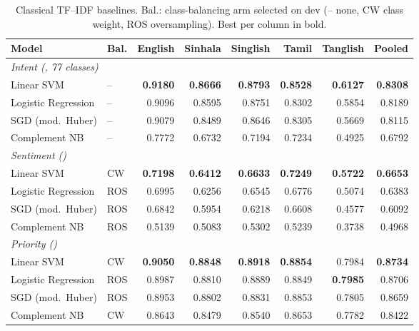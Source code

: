 \begin{table}[!htbp]
\caption{Classical TF--IDF baselines. Bal.: class-balancing arm selected on
dev (-- none, CW class weight, ROS oversampling). Best per column in bold.}
\label{tab:classical_baselines}
\centering
\scriptsize
\setlength{\tabcolsep}{2.6pt}
\begin{tabular}{@{}llrrrrrr@{}}
\toprule
Model & Bal. & English & Sinhala & Singlish & Tamil & Tanglish & Pooled \\
\midrule
\multicolumn{8}{l}{\textit{Intent (\macrof{}, 77 classes)}} \\
Linear SVM & -- & \textbf{0.9180} & \textbf{0.8666} & \textbf{0.8793} & \textbf{0.8528} & \textbf{0.6127} & \textbf{0.8308} \\
Logistic Regression & -- & 0.9096 & 0.8595 & 0.8751 & 0.8302 & 0.5854 & 0.8189 \\
SGD (mod.\ Huber) & -- & 0.9079 & 0.8489 & 0.8646 & 0.8305 & 0.5669 & 0.8115 \\
Complement NB & -- & 0.7772 & 0.6732 & 0.7194 & 0.7234 & 0.4925 & 0.6792 \\
\midrule
\multicolumn{8}{l}{\textit{Sentiment (\negf{})}} \\
Linear SVM & CW & \textbf{0.7198} & \textbf{0.6412} & \textbf{0.6633} & \textbf{0.7249} & \textbf{0.5722} & \textbf{0.6653} \\
Logistic Regression & ROS & 0.6995 & 0.6256 & 0.6545 & 0.6776 & 0.5074 & 0.6383 \\
SGD (mod.\ Huber) & ROS & 0.6842 & 0.5954 & 0.6218 & 0.6608 & 0.4577 & 0.6092 \\
Complement NB & ROS & 0.5139 & 0.5083 & 0.5302 & 0.5239 & 0.3738 & 0.4968 \\
\midrule
\multicolumn{8}{l}{\textit{Priority (\macrof{})}} \\
Linear SVM & CW & \textbf{0.9050} & \textbf{0.8848} & \textbf{0.8918} & \textbf{0.8854} & 0.7984 & \textbf{0.8734} \\
Logistic Regression & ROS & 0.8987 & 0.8810 & 0.8889 & 0.8849 & \textbf{0.7985} & 0.8706 \\
SGD (mod.\ Huber) & ROS & 0.8953 & 0.8802 & 0.8831 & 0.8853 & 0.7805 & 0.8659 \\
Complement NB & CW & 0.8643 & 0.8479 & 0.8540 & 0.8653 & 0.7782 & 0.8422 \\
\bottomrule
\end{tabular}
\end{table}


